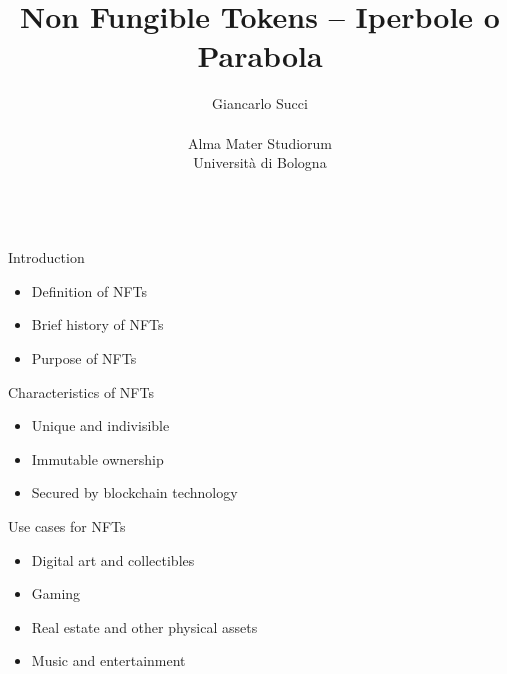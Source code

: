 \documentclass{beamer}
\title[L01]{Non Fungible Tokens -- Iperbole o Parabola} %
\author[{\tiny Giancarlo Succi }]{Giancarlo Succi\\\\ Alma Mater Studiorum\\Universit\`{a} di Bologna\\
\bftt{g.succi@unibo.it}\\
\bftt{+39 380 683 6745}
} %
\institute[unibo] %
\date{} %
\begin{document}
\begin{frame}
\titlepage %

\end{frame}




\begin{frame}
{\centerline{Introduction}}

\begin{itemize}
\item Definition of NFTs
\item Brief history of NFTs
\item Purpose of NFTs
\end{itemize}

\end{frame}

\begin{frame}
{\centerline{Characteristics of NFTs}}

\begin{itemize}
\item Unique and indivisible
\item Immutable ownership
\item Secured by blockchain technology
\end{itemize}

\end{frame}

\begin{frame}
{\centerline{Use cases for NFTs}}

\begin{itemize}
\item Digital art and collectibles
\item Gaming
\item Real estate and other physical assets
\item Music and entertainment
\end{itemize}

\end{frame}
\end{document}
